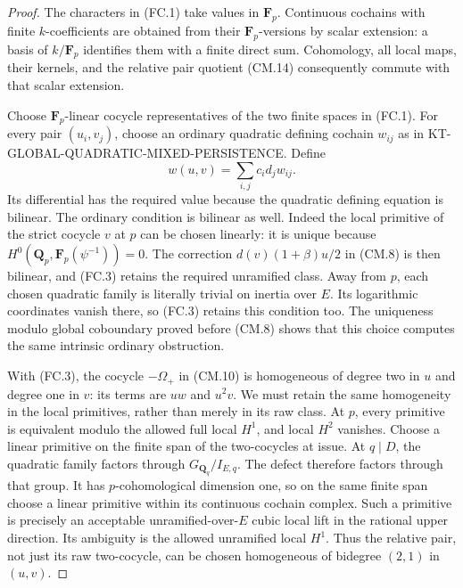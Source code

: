 \begin{proof}
The characters in (FC.1) take values in \(\mathbf F_p\).
Continuous cochains with finite \(k\)-coefficients
are obtained from their \(\mathbf F_p\)-versions
by scalar extension: a basis of \(k/\mathbf F_p\)
identifies them with a finite direct sum.
Cohomology, all local maps, their kernels, and the
relative pair quotient (CM.14) consequently commute
with that scalar extension.

Choose \(\mathbf F_p\)-linear cocycle representatives
of the two finite spaces in (FC.1).
For every pair \((u_i,v_j)\), choose an ordinary
quadratic defining cochain \(w_{ij}\) as in
KT-GLOBAL-QUADRATIC-MIXED-PERSISTENCE.  Define
\[
                 w(u,v)=\sum_{i,j}c_i d_j w_{ij}.
                                                        \tag{FC.3}
\]
Its differential has the required value because
the quadratic defining equation is bilinear.
The ordinary condition is bilinear as well.
Indeed the local primitive of the strict cocycle
\(v\) at \(p\) can be chosen linearly: it is unique
because \(H^0(\mathbf Q_p,\mathbf F_p(\psi^{-1}))=0\).
The correction \(d(v)(1+\beta)u/2\) in (CM.8)
is then bilinear, and (FC.3) retains the required
unramified class.  Away from \(p\), each chosen
quadratic family is literally trivial on inertia
over \(E\).  Its logarithmic coordinates vanish
there, so (FC.3) retains this condition too.
The uniqueness modulo global coboundary proved
before (CM.8) shows that this choice computes
the same intrinsic ordinary obstruction.

With (FC.3), the cocycle \(-\Omega_+\) in (CM.10)
is homogeneous of degree two in \(u\) and degree
one in \(v\): its terms are \(uw\) and \(u^2v\).
We must retain the same homogeneity in the local
primitives, rather than merely in its raw class.
At \(p\), every primitive is equivalent modulo
the allowed full local \(H^1\), and local \(H^2\)
vanishes.  Choose a linear primitive on the
finite span of the two-cocycles at issue.
At \(q\mid D\), the quadratic family factors
through \(G_{\mathbf Q_q}/I_{E,q}\).
The defect therefore factors through that group.
It has \(p\)-cohomological dimension one, so on
the same finite span choose a linear primitive
within its continuous cochain complex.
Such a primitive is precisely an acceptable
unramified-over-\(E\) cubic local lift in the
rational upper direction.  Its ambiguity is
the allowed unramified local \(H^1\).
Thus the relative pair, not just its raw
two-cocycle, can be chosen homogeneous of
bidegree \((2,1)\) in \((u,v)\).


\end{proof}
